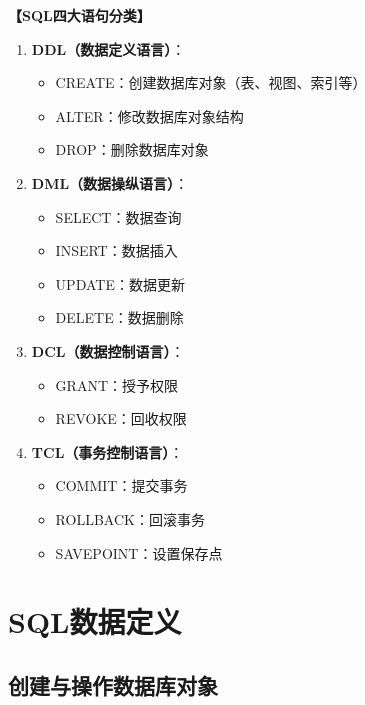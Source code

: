 \documentclass[12pt, a4paper]{article}
\newenvironment{bluebox}[1]{%
  \begin{trivlist}
  \item[\hskip\labelsep \textbf{#1}]
  \setlength{\parskip}{0.5ex}
  \setlength{\itemsep}{0.5ex}
}{%
  \end{trivlist}
}
\begin{document}
\begin{bluebox}{SQL语句分类}
	\textbf{【SQL四大语句分类】}

	\begin{enumerate}[leftmargin=*, label=\textbf{\arabic*.}]
		\item \textbf{DDL（数据定义语言）}：
		      \begin{itemize}
			      \item CREATE：创建数据库对象（表、视图、索引等）
			      \item ALTER：修改数据库对象结构
			      \item DROP：删除数据库对象
		      \end{itemize}
		\item \textbf{DML（数据操纵语言）}：
		      \begin{itemize}
			      \item SELECT：数据查询
			      \item INSERT：数据插入
			      \item UPDATE：数据更新
			      \item DELETE：数据删除
		      \end{itemize}
		\item \textbf{DCL（数据控制语言）}：
		      \begin{itemize}
			      \item GRANT：授予权限
			      \item REVOKE：回收权限
		      \end{itemize}
		\item \textbf{TCL（事务控制语言）}：
		      \begin{itemize}
			      \item COMMIT：提交事务
			      \item ROLLBACK：回滚事务
			      \item SAVEPOINT：设置保存点
		      \end{itemize}
	\end{enumerate}
\end{bluebox}

\section{SQL数据定义}

\subsection{创建与操作数据库对象}
\end{document}
